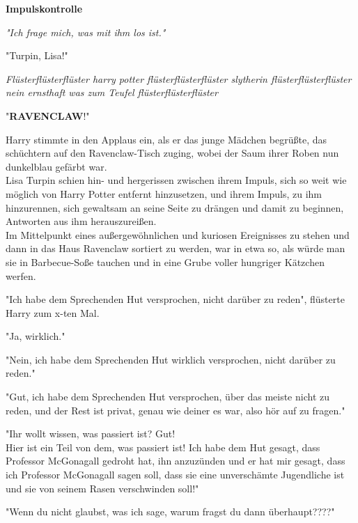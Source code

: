 

\hypertarget{impulskontrolle}{%

\textbf{Impulskontrolle}

\emph{"Ich frage mich, was mit ihm los ist."}

"Turpin, Lisa!"

\emph{Flüsterflüsterflüster harry potter flüsterflüsterflüster slytherin flüsterflüsterflüster nein ernsthaft was zum Teufel flüsterflüsterflüster}

"\textbf{RAVENCLAW}!"

Harry stimmte in den Applaus ein, als er das junge Mädchen begrüßte, das schüchtern auf den Ravenclaw-Tisch zuging, wobei der Saum ihrer Roben nun dunkelblau gefärbt war.\\ Lisa Turpin schien hin- und hergerissen zwischen ihrem Impuls, sich so weit wie möglich von Harry Potter entfernt hinzusetzen, und ihrem Impuls, zu ihm hinzurennen, sich gewaltsam an seine Seite zu drängen und damit zu beginnen, Antworten aus ihm herauszureißen.\\ Im Mittelpunkt eines außergewöhnlichen und kuriosen Ereignisses zu stehen und dann in das Haus Ravenclaw sortiert zu werden, war in etwa so, als würde man sie in Barbecue-Soße tauchen und in eine Grube voller hungriger Kätzchen werfen.

"Ich habe dem Sprechenden Hut versprochen, nicht darüber zu reden", flüsterte Harry zum x-ten Mal.

"Ja, wirklich."

"Nein, ich habe dem Sprechenden Hut wirklich versprochen, nicht darüber zu reden."

"Gut, ich habe dem Sprechenden Hut versprochen, über das meiste nicht zu reden, und der Rest ist privat, genau wie deiner es war, also hör auf zu fragen."

"Ihr wollt wissen, was passiert ist? Gut!\\ Hier ist ein Teil von dem, was passiert ist! Ich habe dem Hut gesagt, dass Professor McGonagall gedroht hat, ihn anzuzünden und er hat mir gesagt, dass ich Professor McGonagall sagen soll, dass sie eine unverschämte Jugendliche ist und sie von seinem Rasen verschwinden soll!"

"Wenn du nicht glaubst, was ich sage, warum fragst du dann überhaupt????"

}
